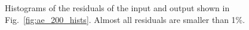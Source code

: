 \documentclass[11pt]{article}
\begin{document}
\begin{figure}[H]
\caption{Histograms of the residuals of the input and output shown in Fig.~\ref{fig:ae_200_hists}. Almost all residuals are smaller than 1\%.} 
\label{fig:ae_200_residuals}
\end{figure}
\end{document}
